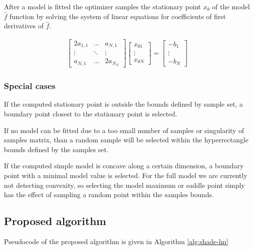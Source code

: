\documentclass[sigconf]{acmart}
\begin{document}
After a model is fitted the optimizer samples the stationary point $x_\theta$
of the model $\hat{f}$ function by solving the system of linear equations for coefficients of first derivatives of $\hat{f}$.

\begin{align}
			\begin{bmatrix}
				2a_{1,1} & \ldots & a_{N,1} \\           
           \vdots & \ddots & \vdots   \\
           a_{N,1} & \ldots & 2a_{N_N}
          \end{bmatrix} 
		  \begin{bmatrix}
			x_{\theta1} \\           
			\vdots \\
			x_{\theta N}
		   \end{bmatrix}
			=
	  \begin{bmatrix}
           -b_1 \\
           \vdots \\
           -b_N
         \end{bmatrix}
  \end{align}

\subsubsection{Special cases}

If the computed stationary point is outside the bounds defined by sample set,
a boundary point closest to the stationary point is selected.

If no model can be fitted due to a too small number of samples or singularity of samples matrix,
than a random sample will be selected within the hyperrectangle bounds defined by the samples set.

If the computed simple model is concave along a certain dimension, a boundary point with a minimal model value is selected. For the full model we are currently not detecting convexity, so selecting the model maximum or saddle point simply
has the effect of sampling a random point within the samples bounds.

\subsection{Proposed algorithm}

Pseudocode of the proposed algorithm is given in Algorithm \ref{alg:shade-lm}
\end{document}
